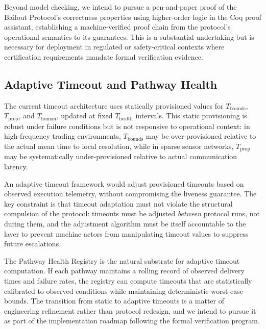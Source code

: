 Beyond model checking, we intend to pursue a pen-and-paper proof of the Bailout Protocol's correctness properties using higher-order logic in the Coq proof assistant, establishing a machine-verified proof chain from the protocol's operational semantics to its guarantees. This is a substantial undertaking but is necessary for deployment in regulated or safety-critical contexts where certification requirements mandate formal verification evidence.

\subsection{Adaptive Timeout and Pathway Health}
\label{sec:adaptive-timeout}

The current timeout architecture uses statically provisioned values for $T_{\text{bounds}}$, $T_{\text{prop}}$, and $T_{\text{human}}$, updated at fixed $T_{\text{health}}$ intervals. This static provisioning is robust under failure conditions but is not responsive to operational context: in high-frequency trading environments, $T_{\text{bounds}}$ may be over-provisioned relative to the actual mean time to local resolution, while in sparse sensor networks, $T_{\text{prop}}$ may be systematically under-provisioned relative to actual communication latency.

An adaptive timeout framework would adjust provisioned timeouts based on observed execution telemetry, without compromising the liveness guarantee. The key constraint is that timeout adaptation must not violate the structural compulsion of the protocol: timeouts must be adjusted \emph{between} protocol runs, not during them, and the adjustment algorithm must be itself accountable to the \fact{} layer to prevent machine actors from manipulating timeout values to suppress future escalations.

The Pathway Health Registry is the natural substrate for adaptive timeout computation. If each pathway maintains a rolling record of observed delivery times and failure rates, the registry can compute timeouts that are statistically calibrated to observed conditions while maintaining deterministic worst-case bounds. The transition from static to adaptive timeouts is a matter of engineering refinement rather than protocol redesign, and we intend to pursue it as part of the implementation roadmap following the formal verification program.

